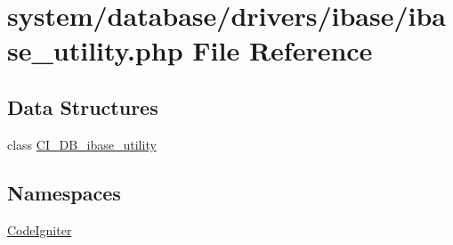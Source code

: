 \hypertarget{ibase__utility_8php}{}\section{system/database/drivers/ibase/ibase\+\_\+utility.php File Reference}
\label{ibase__utility_8php}
\subsection*{Data Structures}
\begin{DoxyCompactItemize}
\item 
class \mbox{\hyperlink{class_c_i___d_b__ibase__utility}{C\+I\+\_\+\+D\+B\+\_\+ibase\+\_\+utility}}
\end{DoxyCompactItemize}
\subsection*{Namespaces}
\begin{DoxyCompactItemize}
\item 
 \mbox{\hyperlink{namespace_code_igniter}{Code\+Igniter}}
\end{DoxyCompactItemize}
